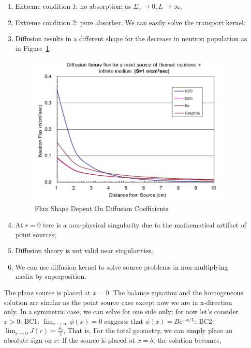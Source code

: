 \documentclass{school-22.211-notes}
\begin{document}
\begin{enumerate}
\item Extreme condition 1: no absorption: as $\Sigma_a \to 0, L\to \infty$, 
\item Extreme condition 2: pure absorber. We can easily solve the transport kernel: 
\item Diffusion results in a different shape for the decrease in neutron population as in Figure~\ref{dfs-shape}.
  \begin{figure}
    \centering
    \includegraphics[width=4in]{images/dfs/dfs-shape.png}
    \caption{Flux Shape Depent On Diffusion Coefficients}\label{dfs-shape}
  \end{figure}
\item At $r=0$ tere is a non-physical singularity due to the mathematical artifact of point sources;
\item Diffusion theory is not valid near singularities;
\item We can use diffusion kernel to solve source problems in non-multiplying media by superposition.
\end{enumerate}

\clearpage
{}
The plane source is placed at $x=0$. The balance equation and the homogeneous solution are similar as the point source case except now we are in x-direction only. In a symmetric case, we can solve for one side only; for now let's consider $x>0$: 
BC1: $\lim_{x \to \infty} \phi(x) = 0$ suggests that $\phi(x) = B e^{-x/L}$; BC2: $\lim_{x\to 0} J(r)  = \frac{S_0}{2}$, 
That is, 
For the total geometry, we can simply place an absolute sign on $x$:
If the source is placed at $x=b$, the solution becomes,
\end{document}
